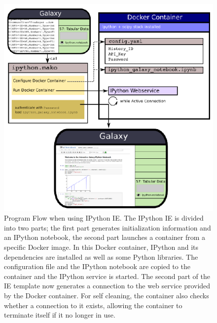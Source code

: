 \documentclass{bioinfo}
\begin{document}
\begin{methods}
\begin{figure}[!tpb]
\centerline{\includegraphics{diagram.pdf}}
\caption{Program Flow when using IPython IE. The IPython IE is divided into two parts;
the first part generates initialization information and an IPython notebook, the second part launches a container
from a specific Docker image. In this Docker container, IPython and its dependencies are installed as well as some Python
libraries. The configuration file and the IPython notebook are copied to the container and the IPython service is started.
The second part of the IE template now generates a connection to the web service provided by the Docker container.
For self cleaning, the container also checks whether a connection to it exists, allowing the container to
terminate itself if it no longer in use.}
\label{fig:diagram}
\end{figure}


\end{methods}
\end{document}

